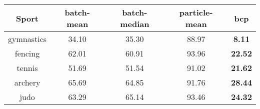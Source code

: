 \begin{tabular}{|c|c|c|c|c|}
\hline
Sport & batch-mean & batch-median & particle-mean & bcp \\
\hline
gymnastics & 34.10 & 35.30 & 88.97 & \textbf{8.11} \\
fencing & 62.01 & 60.91 & 93.96 & \textbf{22.52} \\
tennis & 51.69 & 51.54 & 91.02 & \textbf{21.62} \\
archery & 65.69 & 64.85 & 91.76 & \textbf{28.44} \\
judo & 63.29 & 65.14 & 93.46 & \textbf{24.32} \\
\hline
\end{tabular}
